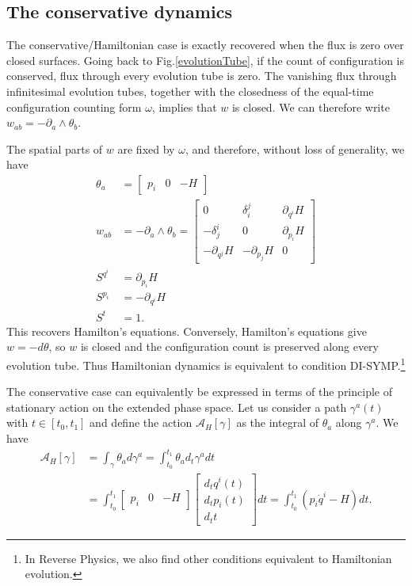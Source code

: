 \documentclass[12pt]{article}
\begin{document}
\subsection{The conservative dynamics}

The conservative/Hamiltonian case is exactly recovered when the flux is zero over closed surfaces. Going back to Fig.\ref{evolutionTube}, if the count of configuration is conserved, flux through every evolution tube is zero. The vanishing flux through infinitesimal evolution tubes, together with the closedness of the equal-time configuration counting form $\omega$, implies that $w$ is closed. We can therefore write $w_{ab} = - \partial_a \wedge \theta_b$.

The spatial parts of $w$ are fixed by $\omega$, and therefore, without loss of generality, we have
\begin{equation}
	\begin{aligned}
		\theta_a &= \begin{bmatrix}
			p_i & 0 & -H
		\end{bmatrix} \\
		w_{ab} &= - \partial_a \wedge \theta_b = \begin{bmatrix}
			0 & \delta_i^j & \partial_{q^i} H \\
			-\delta_j^i & 0 & \partial_{p_i} H \\
			- \partial_{q^j} H & -\partial_{p_j} H & 0
		\end{bmatrix} \\
		S^{q^i} &= \partial_{p_i} H \\
		S^{p_i} &= - \partial_{q^i} H \\
		S^t &= 1.
	\end{aligned}
\end{equation}
This recovers Hamilton's equations. Conversely, Hamilton’s equations give $w=-d\theta$, so $w$ is closed and the configuration count is preserved along every evolution tube. Thus Hamiltonian dynamics is equivalent to condition DI-SYMP.\footnote{In Reverse Physics, we also find other conditions equivalent to Hamiltonian evolution.}

The conservative case can equivalently be expressed in terms of the principle of stationary action on the extended phase space. Let us consider a path $\gamma^a(t)$ with $t \in [t_0, t_1]$ and define the action $\mathcal{A}_H[\gamma]$ as the integral of $\theta_a$ along $\gamma^a$. We have
\begin{equation}
    \begin{aligned}
        \mathcal{A}_H[\gamma] &= \int_\gamma \theta_a d\gamma^a = \int_{t_0}^{t_1} \theta_a d_t \gamma^a dt \\
        &= \int_{t_0}^{t_1} \begin{bmatrix}
            p_i & 0 & -H
        \end{bmatrix} \begin{bmatrix}
            d_t q^i(t) \\ d_t p_i(t) \\ d_t t 
        \end{bmatrix} dt
        = \int_{t_0}^{t_1} ( p_i \dot q^i - H) dt.
    \end{aligned}
\end{equation}
\end{document}
